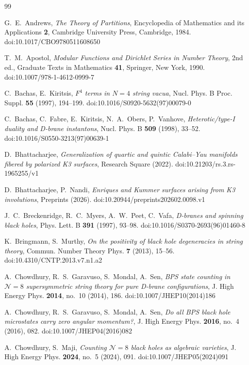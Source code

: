 \documentclass[11pt]{amsart}
\theoremstyle{definition}
\begin{document}
\begin{thebibliography}{99}

 G.~E.~Andrews, \emph{The Theory of Partitions}, Encyclopedia of Mathematics and its Applications \textbf{2}, Cambridge University Press, Cambridge, 1984. doi:10.1017/CBO9780511608650

 T.~M.~Apostol, \emph{Modular Functions and Dirichlet Series in Number Theory}, 2nd ed., Graduate Texts in Mathematics \textbf{41}, Springer, New York, 1990. doi:10.1007/978-1-4612-0999-7

 C.~Bachas, E.~Kiritsis, \emph{$F^4$ terms in $N=4$ string vacua}, Nucl. Phys. B Proc. Suppl. \textbf{55} (1997), 194--199. doi:10.1016/S0920-5632(97)00079-0

 C.~Bachas, C.~Fabre, E.~Kiritsis, N.~A.~Obers, P.~Vanhove, \emph{Heterotic/type-I duality and D-brane instantons}, Nucl. Phys. B \textbf{509} (1998), 33--52. doi:10.1016/S0550-3213(97)00639-1

 D.~Bhattacharjee, \emph{Generalization of quartic and quintic Calabi--Yau manifolds fibered by polarized K3 surfaces}, Research Square (2022). doi:10.21203/rs.3.rs-1965255/v1

 D.~Bhattacharjee, P.~Nandi, \emph{Enriques and Kummer surfaces arising from K3 involutions}, Preprints (2026). doi:10.20944/preprints202602.0098.v1

 J.~C.~Breckenridge, R.~C.~Myers, A.~W.~Peet, C.~Vafa, \emph{D-branes and spinning black holes}, Phys. Lett. B \textbf{391} (1997), 93--98. doi:10.1016/S0370-2693(96)01460-8

 K.~Bringmann, S.~Murthy, \emph{On the positivity of black hole degeneracies in string theory}, Commun. Number Theory Phys. \textbf{7} (2013), 15--56. doi:10.4310/CNTP.2013.v7.n1.a2

 A.~Chowdhury, R.~S.~Garavuso, S.~Mondal, A.~Sen, \emph{BPS state counting in $\mathcal N=8$ supersymmetric string theory for pure D-brane configurations}, J. High Energy Phys. \textbf{2014}, no.~10 (2014), 186. doi:10.1007/JHEP10(2014)186

 A.~Chowdhury, R.~S.~Garavuso, S.~Mondal, A.~Sen, \emph{Do all BPS black hole microstates carry zero angular momentum?}, J. High Energy Phys. \textbf{2016}, no.~4 (2016), 082. doi:10.1007/JHEP04(2016)082

 A.~Chowdhury, S.~Maji, \emph{Counting $\mathcal N=8$ black holes as algebraic varieties}, J. High Energy Phys. \textbf{2024}, no.~5 (2024), 091. doi:10.1007/JHEP05(2024)091


\end{thebibliography}
\end{document}
